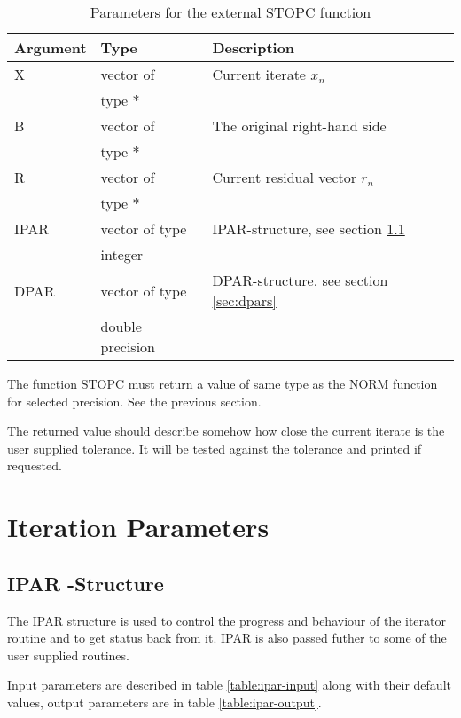 \documentclass[11pt,a4paper,english,oneside]{report}
\begin{document}
\begin{table}[H]
\begin{tabular*}{\textwidth}{lll}
\hline\hline
{\bfseries Argument} & {\bfseries Type} & {\bfseries Description} \\
\hline
X	& vector of 		& Current iterate $x_{n}$ \\
	& type $*$		& \\
B	& vector of 		& The original right-hand side \\
	& type $*$		& \\
R	& vector of 		& Current residual vector $r_{n}$ \\
	& type $*$		& \\
IPAR	& vector of type	& IPAR-structure, see section \ref{sec:ipars} \\
	& integer		& \\
DPAR	& vector of type	& DPAR-structure, see section \ref{sec:dpars} \\
	& double precision	& \\
\hline\hline
\end{tabular*}
\caption{Parameters for the external STOPC function}
\label{table:stopc-param}
\end{table}

The function {\ttfamily STOPC} must return a value of same type as
the {\ttfamily NORM} function for selected precision. See the previous
section.

The returned value should describe somehow how close the current iterate is
the user supplied tolerance. It will be tested against the tolerance and
printed if requested.


\section{Iteration Parameters}

\subsection{IPAR -Structure}
\label{sec:ipars}

The {\ttfamily IPAR} structure is used to control the progress and behaviour
of the iterator routine and to get status back from it. {\ttfamily IPAR}
is also passed futher to some of the user supplied routines.

Input parameters are described in table \ref{table:ipar-input} along with
their default values, output parameters are in table \ref{table:ipar-output}.
\end{document}
